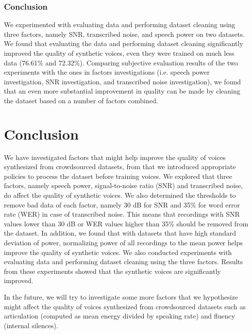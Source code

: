\documentclass[12pt]{article}
\begin{document}
\subsubsection{Conclusion}
We experimented with evaluating data and performing dataset cleaning using three factors, namely SNR, transcribed noise, and speech power on two datasets. We found that evaluating the data and performing dataset cleaning significantly improved the quality of synthetic voices, even they were trained on much less data (76.61\% and 72.32\%). Comparing subjective evaluation results of the two experiments with the ones in factors investigations (i.e. speech power investigation, SNR investigation, and transcribed noise investigation), we found that an even more substantial improvement in quality can be made by cleaning the dataset based on a number of factors combined.



\clearpage

\section{Conclusion}\label{sec_conclusion}
We have investigated factors that might help improve the quality of voices synthesized from crowdsourced datasets, from that we introduced appropriate policies to process the dataset before training voices. We explored that three factors, namely speech power, signal-to-noise ratio (SNR) and transcribed noise, do affect the quality of synthetic voices. We also determined the thresholds to remove bad data of each factor, namely 30 dB for SNR and 35\% for word error rate (WER) in case of transcribed noise. This means that recordings with SNR values lower than 30 dB or WER values higher than 35\% should be removed from the dataset. In addition, we found that with datasets that have high standard deviation of power, normalizing power of all recordings to the mean power helps improve the quality of synthetic voices. We also conducted experiments with evaluating data and performing dataset cleaning using the three factors. Results from these experiments showed that the synthetic voices are significantly improved.

In the future, we will try to investigate some more factors that we hypothesize might affect the quality of voices synthesized from crowdsourced datasets such as articulation (computed as mean energy divided by speaking rate) and fluency (internal silences).
\end{document}
